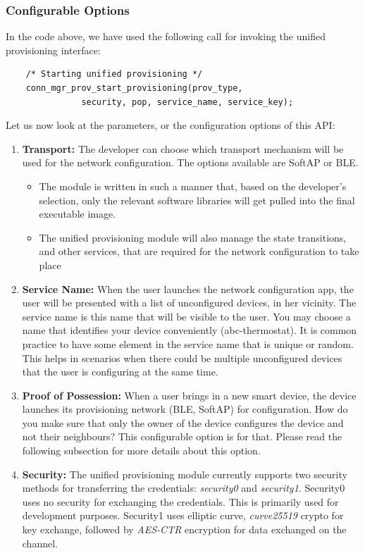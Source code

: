 \documentclass[11pt,fleqn]{book} %
\begin{document}
\subsubsection{Configurable Options}
In the code above, we have used the following call for invoking the unified provisioning interface:
\begin{verbatim}
    /* Starting unified provisioning */
    conn_mgr_prov_start_provisioning(prov_type,
               security, pop, service_name, service_key);
\end{verbatim}

Let us now look at the parameters, or the configuration options of this API:
\begin{enumerate}
    \item \textbf{Transport:} The developer can choose which transport mechanism will be used for the network configuration. The options available are SoftAP or BLE. 
    \begin{itemize}
        \item The module is written in such a manner that, based on the developer's selection, only the relevant software libraries will get pulled into the final executable image. 
        \item The unified provisioning module will also manage the state transitions, and other services, that are required for the network configuration to take place
    \end{itemize}
    \item \textbf{Service Name:} When the user launches the network configuration app, the user will be presented with a list of unconfigured devices, in her vicinity. The service name is this name that will be visible to the user. You may choose a name that identifies your device conveniently (abc-thermostat). It is common practice to have some element in the service name that is unique or random. This helps in scenarios when there could be multiple unconfigured devices that the user is configuring at the same time.
    \item \textbf{Proof of Possession:} When a user brings in a new smart device, the device launches its provisioning network (BLE, SoftAP) for configuration.  How do you make sure that only the owner of the device configures the device and not their neighbours? This configurable option is for that. Please read the following subsection for more details about this option.
    \item \textbf{Security:} The unified provisioning module currently supports two security methods for transferring the credentials: \textit{security0} and \textit{security1}. Security0 uses no security for exchanging the credentials. This is primarily used for development purposes. Security1 uses elliptic curve, \textit{curve25519} crypto for key exchange, followed by \textit{AES-CTR} encryption for data exchanged on the channel.
\end{enumerate}
\end{document}

